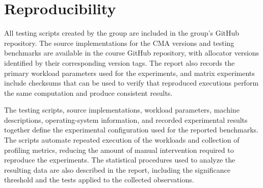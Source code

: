 \section{Reproducibility}
\label{sec:reproducibility}

All testing scripts created by the group are included in the group's GitHub repository. The source implementations for the CMA versions and testing benchmarks are available in the course GitHub repository, with allocator versions identified by their corresponding version tags. The report also records the primary workload parameters used for the experiments, and matrix experiments include checksums that can be used to verify that reproduced executions perform the same computation and produce consistent results.

The testing scripts, source implementations, workload parameters, machine descriptions, operating-system information, and recorded experimental results together define the experimental configuration used for the reported benchmarks. The scripts automate repeated execution of the workloads and collection of profiling metrics, reducing the amount of manual intervention required to reproduce the experiments. The statistical procedures used to analyze the resulting data are also described in the report, including the significance threshold and the tests applied to the collected observations.